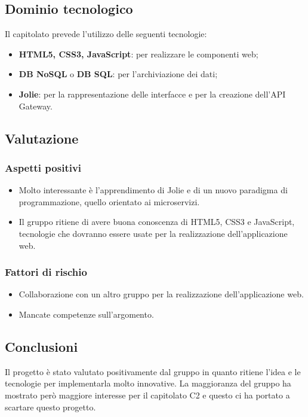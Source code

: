 	\subsection {Dominio tecnologico}
		Il capitolato prevede l'utilizzo delle seguenti tecnologie:
		\begin {itemize}
			\item \textbf{HTML5, CSS3, JavaScript}: per realizzare le componenti web;
			\item \textbf{DB NoSQL} o \textbf{DB SQL}: per l'archiviazione dei dati;
			\item \textbf{Jolie}: per la rappresentazione delle interfacce e per la creazione dell'API Gateway.
		\end {itemize}
	\subsection {Valutazione}
		\subsubsection {Aspetti positivi}
			\begin{itemize}
				\item Molto interessante è l'apprendimento di Jolie e di un nuovo paradigma di programmazione, quello orientato ai microservizi.
				\item Il gruppo ritiene di avere buona conoscenza di HTML5, CSS3 e JavaScript, tecnologie che dovranno essere usate per la realizzazione dell'applicazione web.
			\end{itemize}
		\subsubsection {Fattori di rischio}
			\begin{itemize}
				\item Collaborazione con un altro gruppo per la realizzazione dell'applicazione web.
				\item Mancate competenze sull'argomento.
			\end{itemize}
	\subsection {Conclusioni}
		Il progetto è stato valutato positivamente dal gruppo in quanto ritiene l'idea e le tecnologie per implementarla molto innovative. La maggioranza del gruppo ha mostrato però maggiore interesse
		per il capitolato C2 e questo ci ha portato a scartare questo progetto.